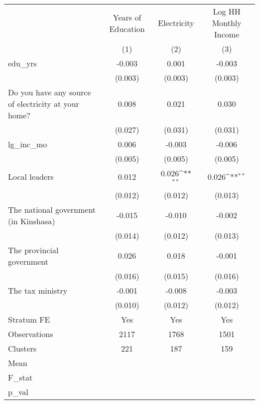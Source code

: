 {
\def\sym#1{\ifmmode^{#1}\else\(^{#1}\)\fi}
\begin{tabular}{l*{3}{c}}
\hline\hline
                &\multicolumn{1}{c}{Years of Education}&\multicolumn{1}{c}{Electricity}&\multicolumn{1}{c}{Log HH Monthly Income}\\
                &\multicolumn{1}{c}{(1)}         &\multicolumn{1}{c}{(2)}         &\multicolumn{1}{c}{(3)}         \\
\hline
edu\_yrs         &   -0.003         &    0.001         &   -0.003         \\
                &  (0.003)         &  (0.003)         &  (0.003)         \\
Do you have any source of electricity at your home?&    0.008         &    0.021         &    0.030         \\
                &  (0.027)         &  (0.031)         &  (0.031)         \\
lg\_inc\_mo       &    0.006         &   -0.003         &   -0.006         \\
                &  (0.005)         &  (0.005)         &  (0.005)         \\
Local leaders   &    0.012         &    0.026\sym{**} &    0.026\sym{**} \\
                &  (0.012)         &  (0.012)         &  (0.013)         \\
The national government (in Kinshasa)&   -0.015         &   -0.010         &   -0.002         \\
                &  (0.014)         &  (0.012)         &  (0.013)         \\
The provincial government&    0.026         &    0.018         &   -0.001         \\
                &  (0.016)         &  (0.015)         &  (0.016)         \\
The tax ministry&   -0.001         &   -0.008         &   -0.003         \\
                &  (0.010)         &  (0.012)         &  (0.012)         \\
Stratum FE      &      Yes         &      Yes         &      Yes         \\
\hline
Observations    &     2117         &     1768         &     1501         \\
Clusters        &      221         &      187         &      159         \\
Mean            &                  &                  &                  \\
F\_stat          &                  &                  &                  \\
p\_val           &                  &                  &                  \\
\hline\hline
\end{tabular}
}
